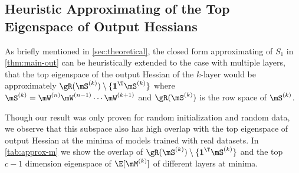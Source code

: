 \subsection{Heuristic Approximating of the Top Eigenspace of Output Hessians}
\label{sec:app_outhessian_exp}

As briefly mentioned in \cref{sec:theoretical}, the closed form approximating of $S_1$ in \cref{thm:main-out} can be heuristically extended to the case with multiple layers, that the top eigenspace of the output Hessian of the $k$-layer would be approximately $\gR(\mS^{(k)})\setminus\{\textbf{1}^\T\mS^{(k)}\}$
where $\mS^{(k)} = \mW^{(n)}\mW^{(n-1)}\cdots\mW^{(k+1)}$ and $\gR(\mS^{(k)})$ is the row space of $\mS^{(k)}$.

Though our result was only proven for random initialization and random data, we observe that this subspace also has high overlap with the top eigenspace of output Hessian at the minima of models trained with real datasets. In \cref{tab:approx-m}  we show the overlap of $ \gR(\mS^{(k)})\setminus\{\textbf{1}^\T \mS^{(k)}\}$ and the top $c-1$ dimension eigenspace of $\E[\mM^{(k)}]$ of different layers at minima.


